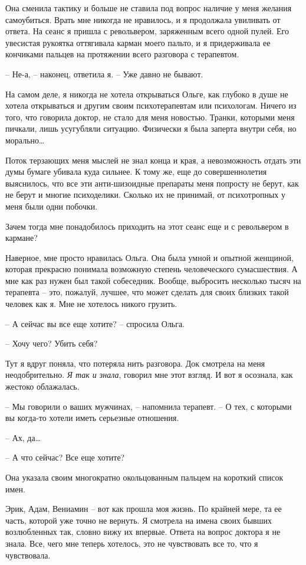 \documentclass[
]{book}
\begin{document}
Она сменила тактику и больше не ставила под вопрос наличие у меня желания самоубиться. Врать мне никогда не нравилось, и я продолжала увиливать от ответа. На сеанс я пришла с револьвером, заряженным всего одной пулей. Его увесистая рукоятка оттягивала карман моего пальто, и я придерживала ее кончиками пальцев на протяжении всего разговора с терапевтом.

-- Не-а, -- наконец, ответила я. -- Уже давно не бывают.

На самом деле, я никогда не хотела открываться Ольге, как глубоко в душе не хотела открываться и другим своим психотерапевтам или психологам. Ничего из того, что говорила доктор, не стало для меня новостью. Транки, которыми меня пичкали, лишь усугубляли ситуацию. Физически я была заперта внутри себя, но морально\ldots{}

Поток терзающих меня мыслей не знал конца и края, а невозможность отдать эти думы бумаге убивала куда сильнее. К тому же, еще до совершеннолетия выяснилось, что все эти анти-шизоидные препараты меня попросту не берут, как не берут и многие психоделики. Сколько их не принимай, от психотропных у меня были одни побочки.

Зачем тогда мне понадобилось приходить на этот сеанс еще и с револьвером в кармане?

Наверное, мне просто нравилась Ольга. Она была умной и опытной женщиной, которая прекрасно понимала возможную степень человеческого сумасшествия. А мне как раз нужен был такой собеседник. Вообще, выбросить несколько тысяч на терапевта -- это, пожалуй, лучшее, что может сделать для своих близких такой человек как я. Мне не хотелось никого грузить.

-- А сейчас вы все еще хотите? -- спросила Ольга.

-- Хочу чего? Убить себя?

Тут я вдруг поняла, что потеряла нить разговора. Док смотрела на меня неодобрительно. \emph{Я так и знала}, говорил мне этот взгляд. И вот я осознала, как жестоко облажалась.

-- Мы говорили о ваших мужчинах, -- напомнила терапевт. -- О тех, с которыми вы когда-то хотели иметь серьезные отношения.

-- Ах, да\ldots{}

-- А что сейчас? Все еще хотите?

Она указала своим многократно окольцованным пальцем на короткий список имен.

Эрик, Адам, Вениамин -- вот как прошла моя жизнь. По крайней мере, та ее часть, которой уже точно не вернуть. Я смотрела на имена своих бывших возлюбленных так, словно вижу их впервые. Ответа на вопрос доктора я не знала. Все, чего мне теперь хотелось, это не чувствовать все то, что я чувствовала.
\end{document}
